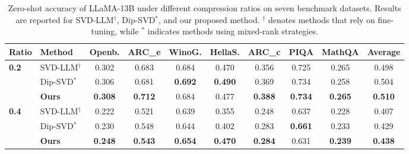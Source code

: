 

\begin{table}[t]
\centering
\small
\renewcommand{\arraystretch}{1.15}
\setlength{\tabcolsep}{5pt}
\newcommand{\na}{\textemdash}
\caption{
Zero-shot accuracy of LLaMA-13B under different compression ratios on seven benchmark datasets. Results are reported for SVD-LLM$^{\dagger}$, Dip-SVD$^{*}$, and our proposed method. $^{\dagger}$ denotes methods that rely on fine-tuning, while $^{*}$ indicates methods using mixed-rank strategies.
}
\begin{tabular}{l l| c c c c c c c | c}
\toprule
\textbf{Ratio} & \textbf{Method} &
\textbf{Openb.} & \textbf{ARC\_e} & \textbf{WinoG.} & \textbf{HellaS.} &
\textbf{ARC\_c} & \textbf{PIQA} & \textbf{MathQA} & \textbf{Average} \\
\midrule
\multirow{3}{*}{\textbf{0.2}}
& SVD-LLM$^\dagger$  & 0.302 & 0.683 & 0.684 & 0.470 & 0.356 & 0.725 & 0.265 & 0.498 \\
& Dip-SVD$^*$  & 0.306 & 0.681 & \textbf{0.692} & \textbf{0.490} & 0.369 & 0.734 & 0.258 & 0.504 \\
\rowcolor{gray!12}
& \textbf{Ours} & \textbf{0.308} & \textbf{0.712} & 0.684 & 0.477 & \textbf{0.388} & \textbf{0.734} & \textbf{0.265} & \textbf{0.510} \\
\midrule
    \multirow{3}{*}{\textbf{0.4}}
& SVD-LLM$^\dagger$  & 0.222 & 0.521 & 0.639 & 0.355 & 0.248 & 0.637 & 0.228 & 0.407 \\
& Dip-SVD$^*$  & 0.230 & 0.548 & 0.644 & 0.402 & 0.283 & \textbf{0.661} & 0.233 & 0.429 \\
\rowcolor{gray!12}
& \textbf{Ours} & \textbf{0.248} & \textbf{0.543} & \textbf{0.654} & \textbf{0.470} & \textbf{0.284} & 0.631 & \textbf{0.239} & \textbf{0.438} \\
\bottomrule
\end{tabular}
\vspace{-0.5cm}
\label{tab large models}
\end{table}




